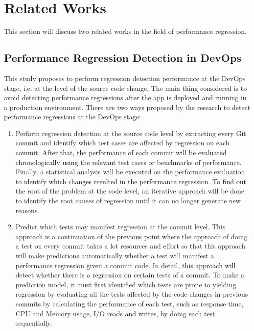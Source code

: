 \documentclass[conference]{configs/IEEEtran}
\begin{document}
\section{Related Works}
This section will discuss two related works in the field of performance regression.

\subsection{Performance Regression Detection in DevOps}
This study \cite{regression-detection} proposes to perform regression detection performance at the DevOps stage, i.e. at the level of the source code change. The main thing considered is to avoid detecting performance regressions after the app is deployed and running in a production environment. There are two ways proposed by the research
to detect performance regressions at the DevOps stage:
\begin{enumerate}
	\item Perform regression detection at the source code level by extracting
	every Git commit and identify which test cases are affected by
	regression on each commit. After that, the performance of each commit will be
	evaluated chronologically using the relevant test cases or
	benchmarks of performance. Finally, a statistical analysis will be executed on the performance evaluation
	to identify which changes resulted in the performance regression. To find out the root of the problem at the code level, an iterative approach will be done  to identify the root causes of
	regression until it can no longer generate new reasons.
	\item Predict which tests may manifest regression at the commit level. This approach is a continuation of the previous point where
	the approach of doing a test on every commit takes a lot
	resources and effort so that this approach will make predictions
	automatically whether a test will manifest a performance regression given a commit code. In detail, this approach will detect whether there is a regression on certain tests of a commit. To make a prediction model, it must first identified which tests are prone to yielding regression by evaluating all the tests affected by the code changes in previous commits by calculating the performance of each test, such as response time,
	CPU and Memory usage, I/O reads and writes, by doing
	each test sequentially.
\end{enumerate}
\end{document}
